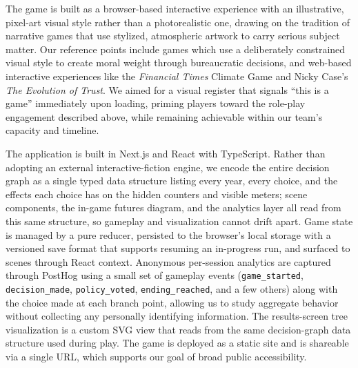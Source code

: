 The game is built as a browser-based interactive experience with an illustrative, pixel-art visual style rather than a photorealistic one, drawing on the tradition of narrative games that use stylized, atmospheric artwork to carry serious subject matter. Our reference points include games which use a deliberately constrained visual style to create moral weight through bureaucratic decisions, and web-based interactive experiences like the \textit{Financial Times} Climate Game and Nicky Case's \textit{The Evolution of Trust}. We aimed for a visual register that signals ``this is a game'' immediately upon loading, priming players toward the role-play engagement described above, while remaining achievable within our team's capacity and timeline.

The application is built in Next.js and React with TypeScript. Rather than adopting an external interactive-fiction engine, we encode the entire decision graph as a single typed data structure listing every year, every choice, and the effects each choice has on the hidden counters and visible meters; scene components, the in-game futures diagram, and the analytics layer all read from this same structure, so gameplay and visualization cannot drift apart. Game state is managed by a pure reducer, persisted to the browser's local storage with a versioned save format that supports resuming an in-progress run, and surfaced to scenes through React context. Anonymous per-session analytics are captured through PostHog using a small set of gameplay events (\texttt{game\_started}, \texttt{decision\_made}, \texttt{policy\_voted}, \texttt{ending\_reached}, and a few others) along with the choice made at each branch point, allowing us to study aggregate behavior without collecting any personally identifying information. The results-screen tree visualization is a custom SVG view that reads from the same decision-graph data structure used during play. The game is deployed as a static site and is shareable via a single URL, which supports our goal of broad public accessibility.
